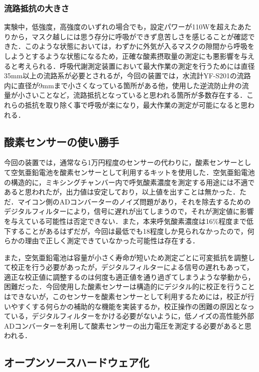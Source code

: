 \subsubsection{流路抵抗の大きさ}

実験中，低強度，高強度のいずれの場合でも，設定パワーが110Wを超えたあたりから，マスク越しには思う存分に呼吸ができず息苦しさを感じることが確認できた．このような状態においては，わずかに外気が入るマスクの隙間から呼吸をしようとするような状態になるため，正確な酸素摂取量の測定にも悪影響を与えると考えられる．呼吸代謝測定装置において最大作業の測定を行うためには直径35mm以上の流路系が必要とされるが，今回の装置では，水流計YF-S201の流路内に直径が9mmまで小さくなっている箇所がある他，使用した逆流防止弁の流量が小さいことなど，流路抵抗となっていると思われる箇所が多数存在する．これらの抵抗を取り除く事で呼吸が楽になり，最大作業の測定が可能になると思われる．

\subsection{酸素センサーの使い勝手}

今回の装置では，通常なら1万円程度のセンサーの代わりに，酸素センサーとして空気亜鉛電池を酸素センサーとして利用するキットを使用した．空気亜鉛電池の構造的に，ミキシングチャンバー内で呼気酸素濃度を測定する用途には不適であると思われたが，出力値は安定しており，以上値を出すことは無かった．ただ．マイコン側のADコンバーターのノイズ問題があり，それを除去するためのデジタルフィルターにより，信号に遅れが出てしまうので，それが測定値に影響を与えている可能性は否定できない．また，本来呼気酸素濃度は16\%程度まで低下することがあるはずだが，今回は最低でも18\％程度しか見られなかったので，何らかの理由で正しく測定できていなかった可能性は存在する．

また，空気亜鉛電池は容量が小さく寿命が短いため測定ごとに可変抵抗を調整して校正を行う必要があったが，デジタルフィルターによる信号の遅れもあって，適正な校正値に調整するのは何度も適正値を通り過ぎてしまうような挙動から，困難だった．今回使用した酸素センサーは構造的にデジタル的に校正を行うことはできないが，このセンサーを酸素センサーとして利用するためには，校正が行いやすくする何らかの補助的な機能を実装するか，校正操作の困難の原因となっている，デジタルフィルターをかける必要がないように，低ノイズの高性能外部ADコンバーターを利用して酸素センサーの出力電圧を測定する必要があると思われる．

\subsection{オープンソースハードウェア化}

